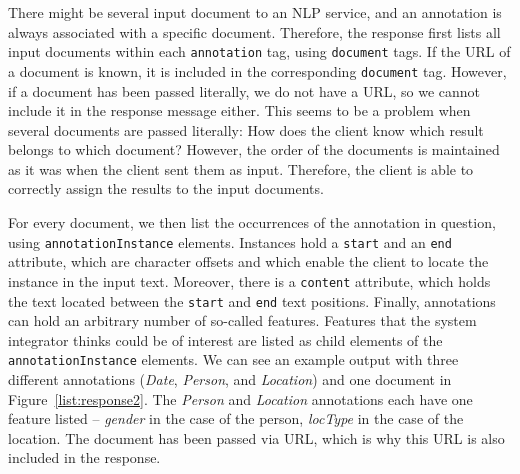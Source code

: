 There might be several input document to an NLP service, and an
annotation is always associated with a specific document. Therefore, the
response first lists all input documents within each
\texttt{annotation} tag, using \texttt{document} tags. If the URL of a
document is known, it is included in the corresponding \texttt{document}
tag. However, if a document has been passed literally, we do not have
a URL, so we cannot include it in the response message either. This
seems to be a problem when several documents are passed literally: How
does the client know which result belongs to which document? However,
the order of the documents is maintained as it was when the client
sent them as input.  Therefore, the client is able to correctly assign
the results to the input documents.

For every document, we then list the occurrences of the annotation in
question, using \texttt{annotationInstance} elements. Instances hold a
\texttt{start} and an \texttt{end} attribute, which are character
offsets and which enable the client to locate the instance in the
input text. Moreover, there is a \texttt{content} attribute, which
holds the text located between the \texttt{start} and \texttt{end}
text positions. Finally, annotations can hold an arbitrary number of
so-called features. Features that the system integrator thinks could
be of interest are listed as child elements of the
\texttt{annotationInstance} elements. We can see an example output
with three different annotations (\emph{Date}, \emph{Person}, and
\emph{Location}) and one document in Figure~\ref{list:response2}. The
\emph{Person} and \emph{Location} annotations each have one feature
listed -- \emph{gender} in the case of the person, \emph{locType} in
the case of the location. The document has been passed via URL, which
is why this URL is also included in the response.

